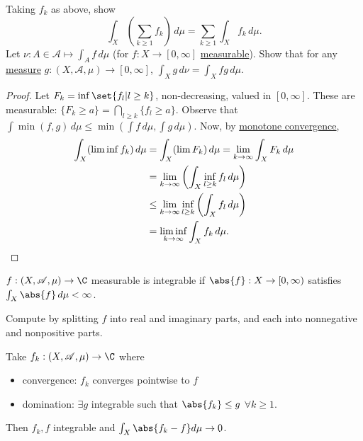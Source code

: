 \documentclass[twoside]{article}
\begin{document}
\begin{ex}
    Taking $f_k$ as above, show
    \begin{equation*}
        \int_X \left(\sum_{k \geq 1} f_k\right) \, d\mu = \sum_{k \geq 1} \int_X f_k \, d\mu.
    \end{equation*}
    Let $\nu: A \in \mathscr{A} \mapsto \int_A f \, d\mu$ (for $f: X \to [0, \infty]$ \hyperlink{def:measFunc}{measurable}).
    Show that for any \hyperlink{def:measure}{measure} $g: (X, \mathscr{A}, \mu) \to [0, \infty]$, $\int_X g \, d\nu = \int_X fg \, d\mu$.
\end{ex}

\begin{proof}
    Let $F_k = \inf\set{f_l | l \geq k}$, non-decreasing, valued in $[0, \infty]$.
    These are measurable: $\{F_k \geq a\} = \bigcap_{l \geq k} \{f_l \geq a\}$.
    Observe that $\int \min(f, g) \, d\mu \leq \min(\int f \, d\mu, \int g \, d\mu)$.
    Now, by \hyperlink{thm:Beppo}{monotone convergence},
    \begin{align*}
        \int_X (\liminf f_k) \, d\mu &= \int_X (\lim F_k) \, d\mu = \lim_{k \to \infty} \int_X F_k \, d\mu \\
                                     &= \lim_{k \to \infty} \left(\int_X  \inf_{l \geq k} f_l \, d\mu\right) \\
                                     &\leq \lim_{k \to \infty} \inf_{l \geq k} \left(\int_X f_l \, d\mu\right)\\
                                     &= \liminf_{k \to \infty} \int_X f_k \, d\mu.\qedhere
    \end{align*}
\end{proof}
\begin{defi}[Integrable]
    $f: (X, \mathscr{A}, \mu) \to \C$ measurable is integrable if $\abs{f}: X \to [0, \infty)$ satisfies $\int_X \abs{f} \, d\mu < \infty$.
\end{defi}
Compute by splitting $f$ into real and imaginary parts, and each into nonnegative and nonpositive parts.

\begin{thm}
    Take $f_k: (X, \mathscr{A}, \mu) \to \C$ where
    \begin{itemize}
        \item convergence: $f_k$ converges pointwise to $f$
        \item domination: $\exists g$ integrable such that $\abs{f_k} \leq g$ $\forall k \geq 1$.
    \end{itemize}
    Then $f_k, f$ integrable and $\int_X \abs{f_k - f} d \mu \to 0$.
\end{thm}
\end{document}

